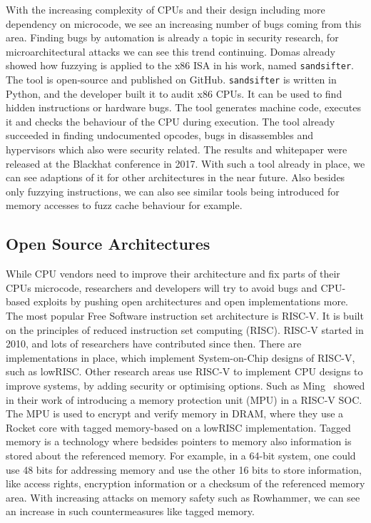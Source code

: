 With the increasing complexity of CPUs and their design including more
dependency on microcode, we see an increasing number of bugs coming from this
area. Finding bugs by automation is already a topic in security research, for
microarchitectural attacks we can see this trend continuing.
Domas\cite{sandsifter} already showed how fuzzying is applied to the x86 ISA in
his work, named \texttt{sandsifter}. The tool is open-source and published on
GitHub\cite{sandsifterurl}. \texttt{sandsifter} is written in Python, and the
developer built it to audit x86 CPUs. It can be used to find hidden instructions
or hardware bugs. The tool generates machine code, executes it and checks the
behaviour of the CPU during execution. The tool already succeeded in finding
undocumented opcodes, bugs in disassembles and hypervisors which also were
security related. The results and whitepaper were released at the Blackhat
conference in 2017\cite{sandsifter}. With such a tool already in place, we can
see adaptions of it for other architectures in the near future. Also besides
only fuzzying instructions, we can also see similar tools being introduced for
memory accesses to fuzz cache behaviour for example.

\subsection{Open Source Architectures}

While CPU vendors need to improve their architecture and fix parts of their
CPU\textquotesingle s microcode, researchers and developers will try to avoid
bugs and CPU-based exploits by pushing open architectures and open
implementations more. The most popular Free Software instruction set
architecture is RISC-V. It is built on the principles of reduced instruction
set computing (RISC). RISC-V started in 2010, and lots of researchers have
contributed since then. There are implementations in place, which implement
System-on-Chip designs of RISC-V, such as lowRISC\cite{lowrisc}. Other
research areas use RISC-V  to implement CPU designs to improve systems, by
adding security or optimising options. Such as Ming~\etal\cite{smarts} showed
in their work of introducing a memory protection unit (MPU) in a RISC-V SOC.
The MPU is used to encrypt and verify memory in DRAM, where they use a Rocket
core with tagged memory-based on a lowRISC implementation. Tagged memory is a
technology where bedsides pointers to memory also information is stored about
the referenced memory. For example, in a 64-bit system, one could use 48 bits
for addressing memory and use the other 16 bits to store information, like
access rights, encryption information or a checksum of the referenced memory
area. With increasing attacks on memory safety such as Rowhammer, we can see an
increase in such countermeasures like tagged memory.

